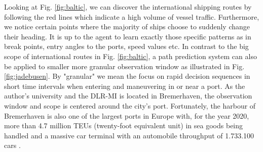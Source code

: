 Looking at Fig. \ref{fig:baltic}, we can discover the international shipping routes by following the red lines which indicate a high volume of vessel traffic. Furthermore, we notice certain points where the majority of ships choose to suddenly change their heading. It is up to the agent to learn exactly those specific patterns as in break points, entry angles to the ports, speed values etc. In contrast to the big scope of international routes in Fig. \ref{fig:baltic}, a path prediction system can also be applied to smaller more granular observation window as illustrated in Fig. \ref{fig:jadebusen}. By "granular" we mean the focus on rapid decision sequences in short time intervals when entering and maneuvering in or near a port. As the author's university and the DLR-MI is located in Bremerhaven, the observation window and scope is centered around the city's port. Fortunately, the harbour of Bremerhaven is also one of the largest ports in Europe with, for the year 2020, more than 4.7 million TEUs (twenty-foot equivalent unit) in sea goods being handled and a massive car terminal with an automobile throughput of 1.733.100 cars \cite[]{bremenports}.